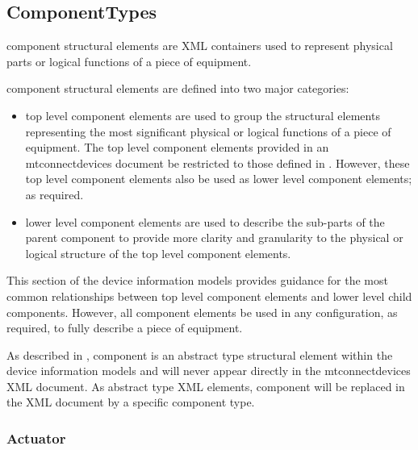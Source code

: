 \subsection{ComponentTypes} \label{sec:ComponentTypes}

\gls{component} \glspl{structural element} are XML containers used to represent physical parts or logical functions of a piece of equipment.

\gls{component} \glspl{structural element} are defined into two major categories:

\begin{itemize}

\item \gls{top level} \gls{component} elements are used to group the \glspl{structural element} representing the most significant physical or logical functions of a piece of equipment.  The \gls{top level} \gls{component} elements provided in an \gls{mtconnectdevices} document \should be restricted to those defined in .  However, these \gls{top level} \gls{component} elements \may also be used as \gls{lower level} \gls{component} elements; as required.

\item \gls{lower level} \gls{component} elements are used to describe the sub-parts of the parent \gls{component} to provide more clarity and granularity to the physical or logical structure of the \gls{top level} \gls{component} elements.
\end{itemize}

This section of the \glspl{device information model} provides guidance for the most common relationships between \gls{top level} \gls{component} elements and \gls{lower level} child components.  However, all \gls{component} elements \may be used in any configuration, as required, to fully describe a piece of equipment.

As described in , \gls{component} is an abstract type \gls{structural element} within the \glspl{device information model} and will never appear directly in the \gls{mtconnectdevices} XML document.  As abstract type XML elements, \gls{component} will be replaced in the XML document by a specific \gls{component} type.


\subsubsection{Actuator}
  \label{sec:Actuator}


